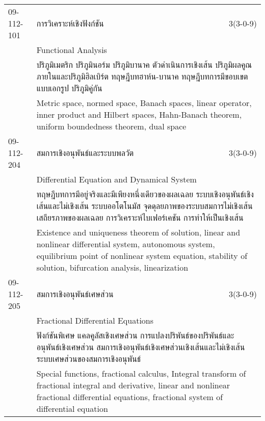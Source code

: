 \begin{longtable}{p{}p{}r{}}
09-112-101 & การวิเคราะห์เชิงฟังก์ชัน & 3(3-0-9)\\*
 & Functional Analysis & \phantom{x} \vspace{3mm} \\*
&  \multicolumn{2}{p{0.75\textwidth}}{ปริภูมิเมตริก ปริภูมินอร์ม ปริภูมิบานาค ตัวดำเนินการเชิงเส้น ปริภูมิผลคูณภายในและปริภูมิฮิลเบิร์ต ทฤษฎีบทฮาห์น-บานาค ทฤษฎีบทการมีขอบเขตแบบเอกรูป ปริภูมิคู่กัน} \vspace{3mm} \\*
&  \multicolumn{2}{p{0.75\textwidth}}{Metric space, normed space, Banach spaces, linear operator, inner product and Hilbert spaces, Hahn-Banach theorem, uniform boundedness theorem, dual space} \vspace{8mm} \\*
09-112-204 & สมการเชิงอนุพันธ์และระบบพลวัต & 3(3-0-9)\\*
 & Differential Equation and Dynamical System & \phantom{x} \vspace{3mm} \\*
&  \multicolumn{2}{p{0.75\textwidth}}{ทฤษฎีบทการมีอยู่จริงและมีเพียงหนึ่งเดียวของผลเฉลย ระบบเชิงอนุพันธ์เชิงเส้นและไม่เชิงเส้น ระบบออโตโนมัส จุดดุลยภาพของระบบสมการไม่เชิงเส้น เสถียรภาพของผลเฉลย การวิเคราะห์ไบเฟอร์เคชัน การทำให้เป็นเชิงเส้น} \vspace{3mm} \\*
&  \multicolumn{2}{p{0.75\textwidth}}{Existence and uniqueness theorem of solution, linear and nonlinear differential system, autonomous system, equilibrium point of nonlinear system equation, stability of solution, bifurcation analysis, linearization} \vspace{8mm} \\*
09-112-205 & สมการเชิงอนุพันธ์เศษส่วน & 3(3-0-9)\\*
 & Fractional Differential Equations & \phantom{x} \vspace{3mm} \\*
&  \multicolumn{2}{p{0.75\textwidth}}{ฟังก์ชันพิเศษ แคลคูลัสเชิงเศษส่วน การแปลงปริพันธ์ของปริพันธ์และอนุพันธ์เชิงเศษส่วน สมการเชิงอนุพันธ์เชิงเศษส่วนเชิงเส้นและไม่เชิงเส้น ระบบเศษส่วนของสมการเชิงอนุพันธ์} \vspace{3mm} \\*
&  \multicolumn{2}{p{0.75\textwidth}}{Special functions, fractional calculus, Integral transform of fractional integral and derivative, linear and nonlinear fractional differential equations, fractional system of differential equation} \vspace{8mm} \\*

\end{longtable}
